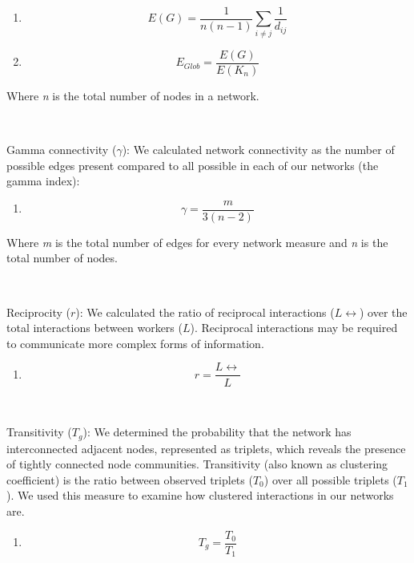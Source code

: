 \documentclass[3p]{elsarticle} %
\providecommand{\tightlist}{%
  \setlength{\itemsep}{0pt}\setlength{\parskip}{0pt}}
\begin{document}
\begin{enumerate}
\def\labelenumi{(\arabic{enumi})}
\setcounter{enumi}{1}
\item
  \[ E(G) = \frac{1}{n(n-1)}\sum_{i \neq j}\frac{1}{d_{ij}} \]
\item
  \[ E_{Glob} = \frac{E(G)}{E(K_n)} \]
\end{enumerate}

Where \emph{n} is the total number of nodes in a network.

~

Gamma connectivity (\(\gamma\)): We calculated network connectivity as
the number of possible edges present compared to all possible in each of
our networks (the gamma index):

\begin{enumerate}
\def\labelenumi{(\arabic{enumi})}
\setcounter{enumi}{3}
\tightlist
\item
  \[\gamma = \frac{m}{3(n-2)}\]
\end{enumerate}

Where \emph{m} is the total number of edges for every network measure
and \emph{n} is the total number of nodes.

~

Reciprocity (\(r\)): We calculated the ratio of reciprocal interactions
(\(L\leftrightarrow\)) over the total interactions between workers
(\(L\)). Reciprocal interactions may be required to communicate more
complex forms of information.

\begin{enumerate}
\def\labelenumi{(\arabic{enumi})}
\setcounter{enumi}{4}
\tightlist
\item
  \[ r = \frac{L\leftrightarrow}{L} \]
\end{enumerate}

~

Transitivity (\(T_g\)): We determined the probability that the network
has interconnected adjacent nodes, represented as triplets, which
reveals the presence of tightly connected node communities. Transitivity
(also known as clustering coefficient) is the ratio between observed
triplets (\(T_0\)) over all possible triplets (\(T_1\)). We used this
measure to examine how clustered interactions in our networks are.

\begin{enumerate}
\def\labelenumi{(\arabic{enumi})}
\setcounter{enumi}{5}
\tightlist
\item
  \[ T_g = \frac{T_0}{T_1} \]
\end{enumerate}
\end{document}
